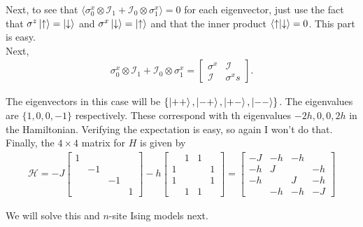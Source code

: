 \documentclass{book}
\theoremstyle{definition}
\newcommand{\had}{\mathcal{H}}
\newcommand{\Id}{\mathcal{I}}
\begin{document}
Next, to see that $\langle \sigma_0^x\otimes \Id_1 + \Id_0 \otimes \sigma_1^x \rangle = 0$ for each eigenvector, just use the fact that $\sigma^z\ket{\uparrow} = \ket{\downarrow}$ and $\sigma^x\ket{\downarrow} = \ket{\uparrow}$ and that the inner product $\braket{\uparrow}{\downarrow} = 0$. This part is easy.\\

Next, 
\begin{align}
\sigma_0^x\otimes \Id_1 + \Id_0 \otimes \sigma_1^x = \begin{bmatrix}
\sigma^x & \Id \\ \Id & \sigma^xs
\end{bmatrix}.
\end{align}

The eigenvectors in this case will be $\{ \ket{++}, \ket{-+}, \ket{+-}, \ket{--}  \}$. The eigenvalues are $\{1,0,0,-1\}$ respectively. These correspond with th eigenvalues $-2h,0,0,2h$ in the Hamiltonian. Verifying the expectation is easy, so again I won't do that.\\

Finally, the $4\times 4$ matrix for $H$ is given by
\begin{align}
\had = -J\begin{bmatrix}
1&&&\\&-1&&\\&&-1&\\&&&1
\end{bmatrix} - h\begin{bmatrix}
&1&1&\\1&&&1\\1&&&1\\&1&1&
\end{bmatrix} = \begin{bmatrix}
-J&-h&-h&\\-h&J&&-h\\-h&&J&-h\\&-h&-h&-J
\end{bmatrix}
\end{align}

We will solve this and $n$-site Ising models next. 
\end{document}
